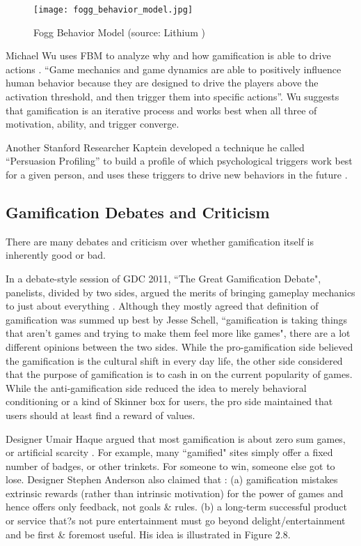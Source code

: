 \begin{figure}[htbp]
	\centering
		\texttt{[image: fogg\_behavior\_model.jpg]}
		\caption{Fogg Behavior Model (source: Lithium \cite{Wu2011})}
		\label{fig:behavior_model}
\end{figure}

Michael Wu uses FBM to analyze why and how gamification is able to drive actions \cite {Wu2011}. ``Game mechanics and game dynamics are able to positively influence human behavior because they are designed to drive the players above the activation threshold, and then trigger them into specific actions''. Wu suggests that gamification is an iterative process and works best when all three of motivation, ability, and trigger converge.

Another Stanford Researcher Kaptein developed a technique he called ``Persuasion Profiling'' to build a profile of which psychological triggers work best for a given person, and uses these triggers to drive new behaviors in the future \cite {kaptein2011adaptive}.  

\subsection{Gamification Debates and Criticism}
There are many debates and criticism over whether gamification itself is inherently good or bad. 

In a debate-style session of GDC 2011, ``The Great Gamification Debate", panelists, divided by two sides, argued the merits of bringing gameplay mechanics to just about everything \cite {magrino2011}. Although they mostly agreed that definition of gamification was summed up best by Jesse Schell, ``gamification is taking things that aren't games and trying to make them feel more like games", there are a lot different opinions between the two sides. While the pro-gamification side believed the gamification is the cultural shift in every day life, the other side considered that the purpose of gamification is to cash in on the current popularity of games. While the anti-gamification side reduced the idea to merely behavioral conditioning or a kind of Skinner box for users, the pro side maintained that users should at least find a reward of values.

Designer Umair Haque argued that most gamification is about zero sum games, or artificial scarcity \cite {haque2010}. For example, many ``gamified" sites simply offer a fixed number of badges, or other trinkets. For someone to win, someone else got to lose. Designer Stephen Anderson also claimed that \cite {anderson2011}:
(a) gamification mistakes extrinsic rewards (rather than intrinsic motivation) for the power of games and hence offers only feedback, not goals \& rules. 
(b) a long-term successful product or service that?s not pure entertainment must go beyond delight/entertainment and be first \& foremost useful.
His idea is illustrated in Figure 2.8.

